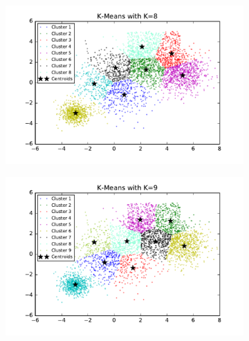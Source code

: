 \begin{description}
\begin{description}
\begin{figure}[!h]
\begin{subfigure}[b]{0.475\textwidth}
        \end{subfigure}
        \hfill
        \begin{subfigure}[b]{0.475\textwidth}  
            \centering 
            \includegraphics[width=\textwidth]{./figures/bigClustering_kMeans_8.pdf}
        \end{subfigure}
        \begin{subfigure}[b]{0.475\textwidth}   
            \centering 
            \includegraphics[width=\textwidth]{./figures/bigClustering_kMeans_9.pdf}
        \end{subfigure}
        \hfill
        \begin{subfigure}[b]{0.475\textwidth}   
            \centering 

\end{subfigure}
\end{figure}
\end{description}
\end{description}
